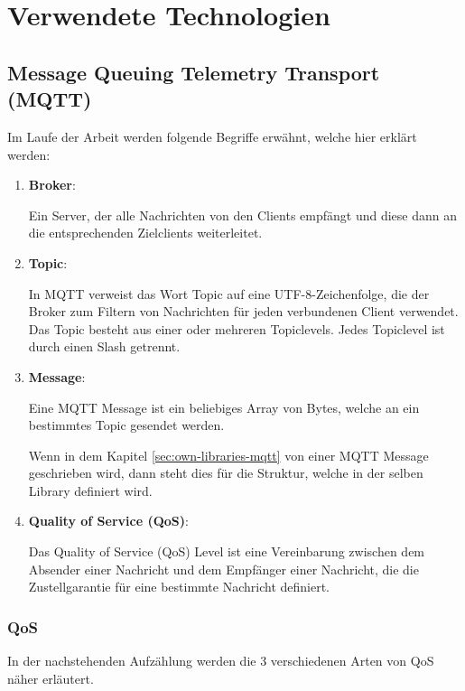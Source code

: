 \chapter{Verwendete Technologien}\label{cha:used-technologies}

\section{Message Queuing Telemetry Transport (MQTT)}\label{sec:mqtt}

Im Laufe der Arbeit werden folgende Begriffe erwähnt, welche hier erklärt werden:

\begin{enumerate}
    \item \textbf{Broker}:
    
    Ein Server, der alle Nachrichten von den Clients empfängt und diese dann an die entsprechenden Zielclients weiterleitet.

    \item \textbf{Topic}:
    
    In MQTT verweist das Wort Topic auf eine UTF-8-Zeichenfolge, die der Broker zum Filtern von Nachrichten für jeden verbundenen Client verwendet. Das Topic besteht aus einer oder mehreren Topiclevels. Jedes Topiclevel ist durch einen Slash getrennt.
    
    \item \textbf{Message}:
    
    Eine MQTT Message ist ein beliebiges Array von Bytes, welche an ein bestimmtes Topic gesendet werden.

    Wenn in dem Kapitel \ref{sec:own-libraries-mqtt} von einer MQTT Message geschrieben wird, dann steht dies für die Struktur, welche in der selben Library definiert wird.

    \item \textbf{Quality of Service (QoS)}:
    
    Das Quality of Service (QoS) Level ist eine Vereinbarung zwischen dem Absender einer Nachricht und dem Empfänger einer Nachricht, die die Zustellgarantie für eine bestimmte Nachricht definiert.
\end{enumerate}

\subsection{QoS}\label{sec:mqtt-qos}

In der nachstehenden Aufzählung werden die 3 verschiedenen Arten von QoS näher erläutert.

